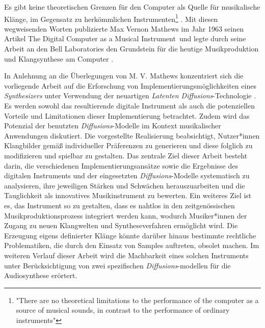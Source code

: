 \documentclass[
  a4paper,  %
  twoside,  %
  bibliography=totoc,
  headsepline,
  cleardoublepage=empty,
  parskip=half,
  draft=false
]{scrbook}
\begin{document}
\glqq Es gibt keine theoretischen Grenzen für den Computer als Quelle für musikalische Klänge, im Gegensatz zu herkömmlichen Instrumenten\grqq \footnote{"There are no theoretical limitations to the performance of the computer as a source of musical sounds, in contrast to the performance of ordinary instruments"} \cite{mathews_digital_1963}. Mit diesen wegweisenden Worten publizierte Max Vernon Mathews im Jahr 1963 seinen Artikel \glqq The Digital Computer as a Musical Instrument\grqq \, und legte durch seine Arbeit an den Bell Laboratories den Grundstein für die heutige Musikproduktion und Klangsynthese am Computer \cite{mathews_music_2004}.

In Anlehnung an die Überlegungen von M. V. Mathews konzentriert sich die vorliegende Arbeit auf die Erforschung von Implementierungsmöglichkeiten eines \emph{Synthesizers} unter Verwendung der neuartigen \emph{Latenten Diffusions}-Technologie \cite{rombach_high-resolution_2022}. Es werden sowohl das resultierende digitale Instrument als auch die potenziellen Vorteile und Limitationen dieser Implementierung betrachtet. Zudem wird das Potenzial der benutzten \emph{Diffusions}-Modelle im Kontext musikalischer Anwendungen diskutiert. Die vorgestellte Realisierung beabsichtigt, Nutzer*innen Klangbilder gemäß individueller Präferenzen zu generieren und diese folglich zu modifizieren und spielbar zu gestalten. Das zentrale Ziel dieser Arbeit besteht darin, die verschiedenen Implementierungsansätze sowie die Ergebnisse des digitalen Instruments und der eingesetzten \emph{Diffusions}-Modelle systematisch zu analysieren, ihre jeweiligen Stärken und Schwächen herauszuarbeiten und die Tauglichkeit als innovatives Musikinstrument zu bewerten. Ein weiteres Ziel ist es, das Instrument so zu gestalten, dass es nahtlos in den zeitgenössischen Musikproduktionsprozess integriert werden kann, wodurch Musiker*innen der Zugang zu neuen Klangwelten und Syntheseverfahren ermöglicht wird. Die Erzeugung eigens definierter Klänge könnte darüber hinaus bestimmte rechtliche Problematiken, die durch den Einsatz von Samples auftreten, obsolet machen. Im weiteren Verlauf dieser Arbeit wird die Machbarkeit eines solchen Instruments unter Berücksichtigung von zwei spezifischen \emph{Diffusions}-modellen für die Audiosynthese erörtert.
\end{document}
